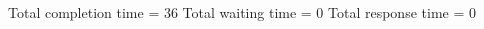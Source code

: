 \begin{RTGrid}[width=0.8\textwidth]{5}{20}
\end{RTGrid}\newline\newline
Total completion time = 36\newline
Total waiting time = 0\newline
Total response time = 0\newline
